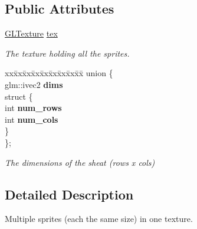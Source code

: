 \subsection*{Public Attributes}
\begin{DoxyCompactItemize}
\item 
\mbox{\label{structnta_1_1SpriteSheet_a6c55217abab2dbd76b61ad92fe902367}} 
\hyperlink{structnta_1_1GLTexture}{G\+L\+Texture} \hyperlink{structnta_1_1SpriteSheet_a6c55217abab2dbd76b61ad92fe902367}{tex}
\begin{DoxyCompactList}\small\item\em The texture holding all the sprites. \end{DoxyCompactList}\item 
\mbox{\label{structnta_1_1SpriteSheet_aad2a930c04420cdc26acbab618453d12}} 
\begin{tabbing}
xx\=xx\=xx\=xx\=xx\=xx\=xx\=xx\=xx\=\kill
union \{\\
\mbox{\label{structnta_1_1SpriteSheet_a9cd7233cd82a28a0acbdbbec805e8a76}} 
glm::ivec2 {\bfseries dims}\\
\mbox{\label{structnta_1_1SpriteSheet_a0c707cf7e684dcea61a99b749fc90758}} 
\>struct \{\\
\mbox{\label{structnta_1_1SpriteSheet_1_1_0D0_1_1_0D2_ac893c02f0affa345b63c86eb59f435b4}} 
int {\bfseries num\_rows}\\
\mbox{\label{structnta_1_1SpriteSheet_1_1_0D0_1_1_0D2_a8f1bbf0a4ad76a8d7162354d9c19b41b}} 
int {\bfseries num\_cols}\\
\>\} \\
\}; \\

\end{tabbing}\begin{DoxyCompactList}\small\item\em The dimensions of the sheat (rows x cols) \end{DoxyCompactList}\end{DoxyCompactItemize}


\subsection{Detailed Description}
Multiple sprites (each the same size) in one texture. 

